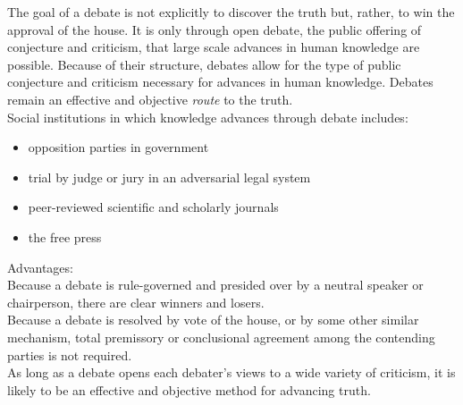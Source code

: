 \documentclass[11pt, fleqn]{article}
\begin{document}
The goal of a debate is not explicitly to discover the truth but, rather, to win the approval of the house. It is only through open debate, the public offering of conjecture and criticism, that large scale advances in human knowledge are possible. Because of their structure, debates allow for the type of public conjecture and criticism necessary for advances in human knowledge. Debates remain an effective and objective \textit{route} to the truth.\\

Social institutions in which knowledge advances through debate includes:
\begin{itemize}
    \item opposition parties in government
    \item trial by judge or jury in an adversarial legal system
    \item peer-reviewed scientific and scholarly journals
    \item the free press
\end{itemize}
Advantages:\\
Because a debate is rule-governed and presided over by a neutral speaker or chairperson, there are clear winners and losers.\\
Because a debate is resolved by vote of the house, or by some other similar mechanism, total premissory or conclusional agreement among the contending parties is not required.\\
As long as a debate opens each debater's views to a wide variety of criticism, it is likely to be an effective and objective method for advancing truth.\\
\end{document}
